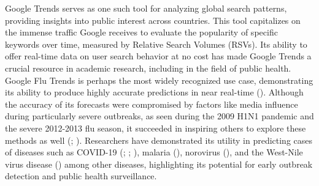 \documentclass[
  12pt,
]{article}
\begin{document}
Google Trends serves as one such tool for analyzing global search
patterns, providing insights into public interest across countries. This
tool capitalizes on the immense traffic Google receives to evaluate the
popularity of specific keywords over time, measured by Relative Search
Volumes (RSVs). Its ability to offer real-time data on user search
behavior at no cost has made Google Trends a crucial resource in
academic research, including in the field of public health. Google Flu
Trends is perhaps the most widely recognized use case, demonstrating its
ability to produce highly accurate predictions in near real-time
(). Although the
accuracy of its forecasts were compromised by factors like media
influence during particularly severe outbreaks, as seen during the 2009
H1N1 pandemic and the severe 2012-2013 flu season, it succeeded in
inspiring others to explore these methods as well
(;
). Researchers have demonstrated
its utility in predicting cases of diseases such as COVID-19
(;
;
), malaria
(),
norovirus (), and the
West-Nile virus disease () among other diseases, highlighting its potential for early
outbreak detection and public health surveillance.
\end{document}
